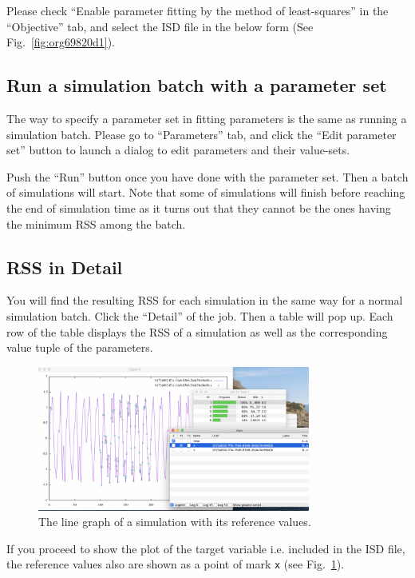 \documentclass[a4paper,10pt]{report}
\begin{document}
Please check ``Enable parameter fitting by the method of least-squares'' in the
``Objective'' tab, and select the ISD file in the below form (See
Fig.~\ref{fig:org69820d1}).

\subsection{Run a simulation batch with a parameter set}
\label{sec:org0e9e2ea}
The way to specify a parameter set in fitting parameters is the same as running
a simulation batch. Please go to ``Parameters'' tab, and click the ``Edit parameter
set'' button to launch a dialog to edit parameters and their value-sets.

Push the ``Run'' button once you have done with the parameter set. Then a batch
of simulations will start. Note that some of simulations will finish before
reaching the end of simulation time as it turns out that they cannot be the ones
having the minimum RSS among the batch.

\subsection{RSS in Detail}
\label{sec:orgca3639d}
You will find the resulting RSS for each simulation in the same way for a normal
simulation batch. Click the ``Detail'' of the job. Then a table will pop up.
Each row of the table displays the RSS of a simulation as well as the
corresponding value tuple of the parameters.

\begin{figure}[htbp]
\centering
\includegraphics[width=0.8\textwidth]{image/parameter-fitting-plot.png}
\caption{\label{fig:org859aa90}The line graph of a simulation with its reference values.}
\end{figure}

If you proceed to show the plot of the target variable i.e. included in the ISD
file, the reference values also are shown as a point of mark \texttt{x} (see
Fig.~\ref{fig:org859aa90}).
\end{document}
